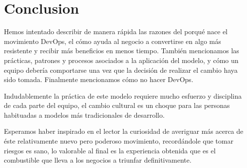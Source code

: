 \documentclass[conference]{IEEEtran}
\begin{document}
\section{Conclusion}
Hemos intentado describir de manera rápida las razones del porqué nace el movimiento DevOps, el cómo ayuda al negocio a convertirse en algo más resistente y recibir más beneficios en menos tiempo. También mencionamos las prácticas, patrones y procesos asociados a la aplicación del modelo, y cómo un equipo debería comportarse una vez que la decisión de realizar el cambio haya sido tomada. Finalmente mencionamos cómo no hacer DevOps.

Indudablemente la práctica de este modelo requiere mucho esfuerzo y disciplina de cada parte del equipo, el cambio cultural es un choque para las personas habituadas a modelos más tradicionales de desarrollo. 

Esperamos haber inspirado en el lector la curiosidad de averiguar más acerca de éste relativamente nuevo pero poderoso movimiento, recordándole que tomar riesgos es sano, lo valorable al final es la experiencia obtenida que es el combustible que lleva a los negocios a triunfar definitivamente.







\end{document}
